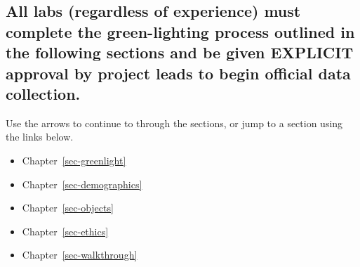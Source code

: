 \documentclass[
  letterpaper,
  DIV=11,
  numbers=noendperiod,
  oneside]{scrreprt}
\providecommand{\tightlist}{%
  \setlength{\itemsep}{0pt}\setlength{\parskip}{0pt}}
\begin{document}
\begin{tcolorbox}[enhanced jigsaw, coltitle=black, colframe=quarto-callout-important-color-frame, titlerule=0mm, colback=white, arc=.35mm, toprule=.15mm, left=2mm, colbacktitle=quarto-callout-important-color!10!white, opacityback=0, bottomtitle=1mm, title=\textcolor{quarto-callout-important-color}{\faExclamation}\hspace{0.5em}{Green-Lighting}, breakable, rightrule=.15mm, opacitybacktitle=0.6, toptitle=1mm, leftrule=.75mm, bottomrule=.15mm]

\subsection*{\texorpdfstring{All labs (regardless of experience) must
complete the green-lighting process outlined in the following sections
and be given EXPLICIT approval by project leads to begin official data
collection.\footnotemark{}}{All labs (regardless of experience) must complete the green-lighting process outlined in the following sections and be given EXPLICIT approval by project leads to begin official data collection.}}\label{all-labs-regardless-of-experience-must-complete-the-green-lighting-process-outlined-in-the-following-sections-and-be-given-explicit-approval-by-project-leads-to-begin-official-data-collection.getting-started-1}

\end{tcolorbox}


Use the arrows to continue to through the sections, or jump to a section
using the links below.

\begin{itemize}
\tightlist
\item
  Chapter~\ref{sec-greenlight}
\item
  Chapter~\ref{sec-demographics}
\item
  Chapter~\ref{sec-objects}
\item
  Chapter~\ref{sec-ethics}
\item
  Chapter~\ref{sec-walkthrough}
\end{itemize}
\end{document}
